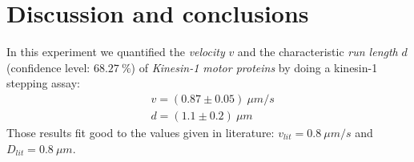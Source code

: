 \section{Discussion and conclusions}
	In this experiment we quantified the \textit{velocity} $v$ and the characteristic \textit{run length} $d$ (confidence level: $68.27\ \unit{\%}$) of \textit{Kinesin-1 motor proteins} by doing a kinesin-1 stepping assay:	
	\begin{align*}
	&v = (0.87 \pm 0.05)\ \unit{\mu m / s}\\
	&d = (1.1 \pm 0.2)\ \unit{\mu m}
	\end{align*} 
	Those results fit good to the values given in literature: $v_{lit} = 0.8\ \unit{\mu m/s}$\cite{PA} and $D_{lit} = 0.8\ \unit{\mu m}$\cite{runLength}.